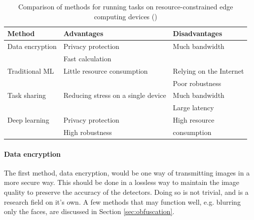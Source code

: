 \begin{table}[H]
    \centering
    \renewcommand{\arraystretch}{1.5} %
    \setlength{\tabcolsep}{1em}
    \begin{tabular}{|l|l|l|}
        \hline
        \rowcolor{gray!25}
        \textbf{Method} & \textbf{Advantages}                & \textbf{Disadvantages}  \\ \hline
        Data encryption & Privacy protection                 & Much bandwidth          \\
                        & Fast calculation                   &                         \\ \hline
        Traditional ML  & Little resource consumption        & Relying on the Internet \\
                        &                                    & Poor robustness         \\ \hline
        Task sharing    & Reducing stress on a single device & Much bandwidth          \\
                        &                                    & Large latency           \\ \hline
        Deep learning   & Privacy protection                 & High resource           \\
                        & High robustness                    & consumption             \\ \hline
    \end{tabular}
    \caption{\centering Comparison of methods for running tasks on resource-constrained
        edge computing devices (\cite{hu2022accurateobjectdetectionatedge})}
    \label{tab:methods_to_run_tasks}
\end{table}

\paragraph{Data encryption}
The first method, data encryption, would be one way of transmitting images in a more secure way. This should be done in a lossless way to maintain the image quality to preserve the accuracy of the detectors. Doing so is not trivial, and is a research field on it's own. A few methods that may function well, e.g. blurring only the faces, are discussed in Section \ref{sec:obfuscation}.

